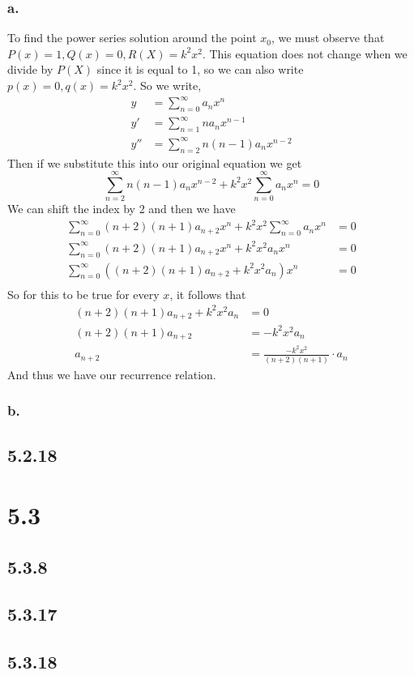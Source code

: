 \documentclass{article}
\theoremstyle{definition}
\begin{document}
            \subsubsection*{a.}
                To find the power series solution around the point $x_0$,
                we must observe that $P(x) = 1, Q(x) = 0, R(X) = k^2 x^2$.
                This equation does not change when we divide by $P(X)$ since 
                it is equal to 1, so we can also write $p(x) = 0, q(x) = k^2 x^2$.
                So we write,
                \begin{align*}
                    y &= \sum_{n=0}^\infty a_n x^n \\
                    y' &= \sum_{n=1}^\infty n a_n x^{n-1} \\
                    y'' &= \sum_{n=2}^\infty n (n-1) a_n x^{n-2}
                \end{align*}
                Then if we substitute this into our original equation we get 
                \[
                    \sum_{n=2}^\infty n (n-1) a_n x^{n-2}
                    + k^2 x^2 \sum_{n=0}^\infty a_n x^n 
                    = 0
                \] 
                We can shift the index by 2 and then we have 
                \begin{align*}
                    \sum_{n=0}^\infty (n+2) (n+1) a_{n+2} x^{n}
                    + k^2 x^2 \sum_{n=0}^\infty a_n x^n 
                    &= 0 \\
                    \sum_{n=0}^\infty (n + 2) (n + 1) a_{n+2} x^n
                    + k^2 x^2 a_n x^n &= 0 \\
                    \sum_{n=0}^\infty \left( (n + 2) (n + 1) a_{n+2} 
                    + k^2 x^2 a_n\right) x^n &= 0 \\
                \end{align*}
                So for this to be true for every $x$, it follows that 
                \begin{align*}
                    (n + 2) (n + 1) a_{n+2} + k^2 x^2 a_n &= 0 \\
                    (n + 2) (n + 1) a_{n+2} &= -k^2 x^2 a_n \\
                    a_{n+2} &= \frac{-k^2 x^2}{(n+2) (n+1)} \cdot a_n
                \end{align*}
                And thus we have our recurrence relation.
            \subsubsection*{b.}
                
    \subsection*{5.2.18}
\section*{5.3}
    \subsection*{5.3.8}
    \subsection*{5.3.17}
    \subsection*{5.3.18}
\end{document}

